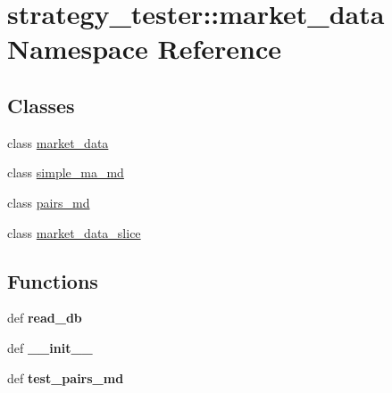 \hypertarget{namespacestrategy__tester_1_1market__data}{\section{strategy\-\_\-tester\-:\-:market\-\_\-data \-Namespace \-Reference}
\label{namespacestrategy__tester_1_1market__data}
}
\subsection*{\-Classes}
\begin{DoxyCompactItemize}
\item 
class \hyperlink{classstrategy__tester_1_1market__data_1_1market__data}{market\-\_\-data}
\item 
class \hyperlink{classstrategy__tester_1_1market__data_1_1simple__ma__md}{simple\-\_\-ma\-\_\-md}
\item 
class \hyperlink{classstrategy__tester_1_1market__data_1_1pairs__md}{pairs\-\_\-md}
\item 
class \hyperlink{classstrategy__tester_1_1market__data_1_1market__data__slice}{market\-\_\-data\-\_\-slice}
\end{DoxyCompactItemize}
\subsection*{\-Functions}
\begin{DoxyCompactItemize}
\item 
\hypertarget{namespacestrategy__tester_1_1market__data_a2b46078fad2ae3df501cdfd5e98f6707}{def {\bfseries read\-\_\-db}}\label{namespacestrategy__tester_1_1market__data_a2b46078fad2ae3df501cdfd5e98f6707}

\item 
\hypertarget{namespacestrategy__tester_1_1market__data_ad89f9c9abc28ca171effacd8c4dfa258}{def {\bfseries \-\_\-\-\_\-init\-\_\-\-\_\-}}\label{namespacestrategy__tester_1_1market__data_ad89f9c9abc28ca171effacd8c4dfa258}

\item 
\hypertarget{namespacestrategy__tester_1_1market__data_ad5b701cf184dcf2083249d12149d1b02}{def {\bfseries test\-\_\-pairs\-\_\-md}}\label{namespacestrategy__tester_1_1market__data_ad5b701cf184dcf2083249d12149d1b02}

\end{DoxyCompactItemize}
